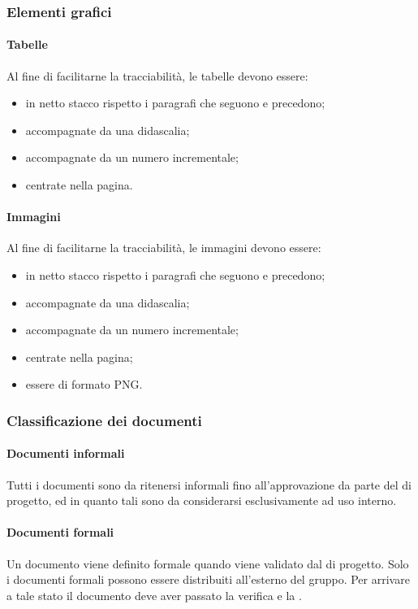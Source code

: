 \subsubsection{Elementi grafici}
 \paragraph{Tabelle}
 Al fine di facilitarne la tracciabilità, le tabelle devono essere:
 \begin{itemize}
 	\item in netto stacco rispetto i paragrafi che seguono e precedono;
 	\item accompagnate da una didascalia;
 	\item accompagnate da un numero incrementale;
 	\item centrate nella pagina.
 \end{itemize}
 \paragraph{Immagini}

Al fine di facilitarne la tracciabilità, le immagini devono essere:
\begin{itemize}
	\item in netto stacco rispetto i paragrafi che seguono e precedono;
	\item accompagnate da una didascalia;
	\item accompagnate da un numero incrementale;
	\item centrate nella pagina;
	\item essere di formato PNG.
\end{itemize}
\subsubsection{Classificazione dei documenti}
 \paragraph{Documenti informali}
 Tutti i documenti sono da ritenersi informali fino all'approvazione da parte del \RESP{} di progetto, ed in quanto tali sono da considerarsi esclusivamente ad uso interno.
 \paragraph{Documenti formali}
 Un documento viene definito formale quando viene validato dal \RESP{} di progetto. Solo i documenti formali possono essere distribuiti all'esterno del gruppo. Per arrivare a tale stato il
documento deve aver passato la verifica e la .
